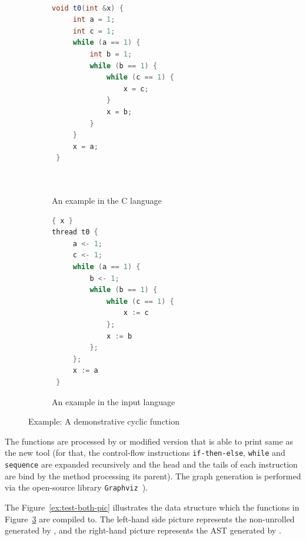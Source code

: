 \begin{figure}[!h]
\begin{subfigure}[b]{.53\textwidth}\centering
\begin{lstlisting}[language=Java,basicstyle=\ttfamily\small]

void t0(int &x) {
     int a = 1;
     int c = 1;
     while (a == 1) {
         int b = 1;
         while (b == 1) {
             while (c == 1) {
                 x = c;
             }
             x = b;
         }
     }
     x = a;
 }
 
 
\end{lstlisting}
\caption{An example in the C language}
\label{ex:both-cf:ptsC}
\end{subfigure}
\begin{subfigure}[b]{.45\textwidth}\centering
\begin{lstlisting}[language=Java,basicstyle=\ttfamily\small]
{ x }
thread t0 {
     a <- 1;
     c <- 1;
     while (a == 1) {
         b <- 1;
         while (b == 1) {
             while (c == 1) {
                 x := c
             };
             x := b
         };
     };
     x := a
 }
\end{lstlisting}
\caption{An example in the \porthos[1] input language}
\label{ex:both-cf:pts1}
\end{subfigure}
\caption{Example: A demonstrative cyclic function}
\label{ex:test-both-cf}
\end{figure}

The functions are processed by \porthos[2] or modified version \porthos[1] that is able to print same \xgraph[CF] as the new tool (for that, the control-flow instructions \texttt{if-then-else}, \texttt{while} and \texttt{sequence} are expanded recursively and the head and the tails of each instruction are bind by the method processing its parent).
The graph generation is performed via the open-source library \texttt{Graphviz}~\cite{ellson2001graphviz}).

The Figure~\ref{ex:test-both-pic} illustrates the data structure which the functions in Figure~\ref{ex:test-both-cf} are compiled to.
The left-hand side picture represents the non-unrolled \xgraph[CF] generated by \porthos[2], and the right-hand picture represents the AST generated by \porthos[1].

